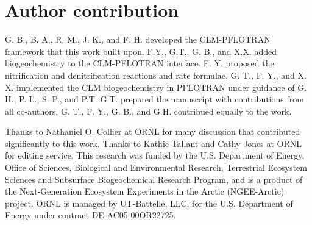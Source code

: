 \documentclass[gmd, manuscript]{copernicus}
\begin{document}
\section{Author contribution}
G. B., B. A., R. M., J. K., and F. H. developed the CLM-PFLOTRAN framework that this
work built upon. F.Y., G.T., G. B., and X.X. added biogeochemistry to the CLM-PFLOTRAN
interface. F. Y. proposed the nitrification and denitrification reactions and
rate formulae. G. T., F. Y., and X. X. implemented the CLM
biogeochemistry in PFLOTRAN under guidance of G. H., P. L., S. P., and P.T.
G.T. prepared the manuscript with contributions from all co-authors. 
G. T., F. Y., G. B., and G.H. contribued equally to the work.  

\begin{acknowledgements}
Thanks to Nathaniel O. Collier at ORNL for many discussion that contributed significantly to this work.
Thanks to Kathie Tallant and Cathy Jones at ORNL for editing service. This research was funded by the U.S. Department of Energy, Office of Sciences,
Biological and Environmental Research, Terrestrial Ecosystem Sciences and
Subsurface Biogeochemical Research Program, and is a product of the
Next-Generation Ecosystem Experiments in the Arctic (NGEE-Arctic) project.
ORNL is managed by UT-Battelle, LLC, for the U.S. Department of Energy under
contract DE-AC05-00OR22725.
\end{acknowledgements}











%
\end{document}
